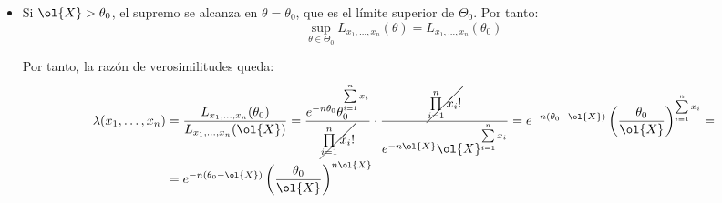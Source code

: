 \begin{ejemplo}
\begin{itemize}
\begin{itemize}
            \item Si $\ol{X} > \theta_0$, el supremo se alcanza en $\theta = \theta_0$, que es el límite superior de $\Theta_0$. Por tanto:
            \begin{equation*}
                \sup\limits_{\theta\in\Theta_0} L_{x_1, \dots, x_n}(\theta) = L_{x_1, \dots, x_n}(\theta_0)
            \end{equation*}

            Por tanto, la razón de verosimilitudes queda:
            \begin{align*}
                \lambda(x_1, \dots, x_n) &= \frac{L_{x_1, \dots, x_n}(\theta_0)}{L_{x_1, \dots, x_n}(\ol{X})} = \frac{e^{-n\theta_0}\theta_0^{\sum\limits_{i=1}^{n} x_i}}{\cancel{\prod\limits_{i=1}^{n} x_i!}} \cdot \frac{\cancel{\prod\limits_{i=1}^{n} x_i!}}{e^{-n\ol{X}}\ol{X}^{\sum\limits_{i=1}^{n} x_i}} = e^{-n(\theta_0 - \ol{X})}\left(\frac{\theta_0}{\ol{X}}\right)^{\sum\limits_{i=1}^{n} x_i}
                =\\&= e^{-n(\theta_0 - \ol{X})}\left(\frac{\theta_0}{\ol{X}}\right)^{n\ol{X}}
            \end{align*}


\end{itemize}
\end{itemize}
\end{ejemplo}
